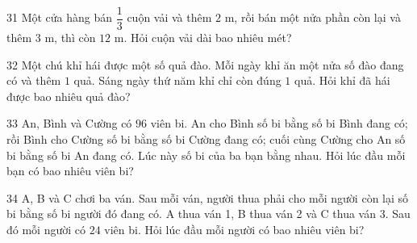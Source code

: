 \begin{probbox}{31}{}
Một cửa hàng bán $\dfrac13$ cuộn vải và thêm $2$ m, rồi bán một nửa phần còn lại và thêm $3$ m, thì còn $12$ m. Hỏi cuộn vải dài bao nhiêu mét?
\end{probbox}
\gap
\begin{probbox}{32}{}
Một chú khỉ hái được một số quả đào. Mỗi ngày khỉ ăn một nửa số đào đang có và thêm $1$ quả. Sáng ngày thứ năm khỉ chỉ còn đúng $1$ quả. Hỏi khỉ đã hái được bao nhiêu quả đào?
\end{probbox}
\gap
\begin{probbox}{33}{}
An, Bình và Cường có $96$ viên bi. An cho Bình số bi bằng số bi Bình đang có; rồi Bình cho Cường số bi bằng số bi Cường đang có; cuối cùng Cường cho An số bi bằng số bi An đang có. Lúc này số bi của ba bạn bằng nhau. Hỏi lúc đầu mỗi bạn có bao nhiêu viên bi?
\end{probbox}
\gap
\begin{probbox}{34}{}
A, B và C chơi ba ván. Sau mỗi ván, người thua phải cho mỗi người còn lại số bi bằng số bi người đó đang có. A thua ván 1, B thua ván 2 và C thua ván 3. Sau đó mỗi người có $24$ viên bi. Hỏi lúc đầu mỗi người có bao nhiêu viên bi?
\end{probbox}
